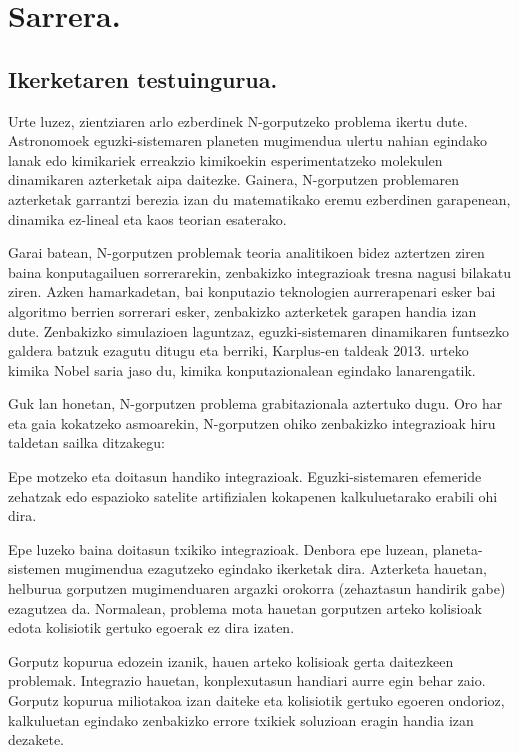 \chapter{Sarrera.}


\section{Ikerketaren testuingurua.}

Urte luzez, zientziaren arlo ezberdinek N-gorputzeko problema ikertu dute. Astronomoek eguzki-sistemaren planeten mugimendua ulertu nahian egindako lanak edo kimikariek erreakzio kimikoekin esperimentatzeko molekulen dinamikaren azterketak aipa daitezke. Gainera,  N-gorputzen problemaren azterketak garrantzi berezia izan du matematikako eremu ezberdinen garapenean,  dinamika ez-lineal eta kaos teorian esaterako. 

Garai batean, N-gorputzen problemak teoria analitikoen bidez aztertzen ziren baina konputagailuen sorrerarekin, zenbakizko integrazioak tresna nagusi bilakatu ziren. Azken hamarkadetan, bai konputazio teknologien aurrerapenari esker bai algoritmo berrien sorrerari esker, zenbakizko azterketek garapen handia izan dute. Zenbakizko simulazioen laguntzaz, eguzki-sistemaren dinamikaren funtsezko galdera batzuk ezagutu ditugu eta berriki, Karplus-en taldeak 2013. urteko kimika Nobel saria \cite{Karplus2014} jaso du, kimika konputazionalean egindako lanarengatik.       

Guk lan honetan, N-gorputzen problema grabitazionala aztertuko dugu. Oro har eta gaia kokatzeko asmoarekin, N-gorputzen ohiko zenbakizko  integrazioak hiru taldetan sailka ditzakegu:
\begin{enumerate}
{
\item Epe motzeko eta doitasun handiko integrazioak. 
 Eguzki-sistemaren efemeride zehatzak \cite{Folkner2014} edo espazioko satelite artifizialen kokapenen \cite{Beylkin2014} kalkuluetarako erabili ohi dira.
\item Epe luzeko baina doitasun txikiko integrazioak.
 Denbora epe luzean, planeta-sistemen mugimendua ezagutzeko egindako ikerketak dira. Azterketa hauetan, helburua gorputzen mugimenduaren argazki orokorra (zehaztasun handirik gabe) ezagutzea da. Normalean, problema mota hauetan gorputzen arteko kolisioak edota kolisiotik gertuko egoerak ez dira izaten.     
\item Gorputz kopurua edozein izanik, hauen arteko kolisioak gerta daitezkeen problemak.
 Integrazio hauetan, konplexutasun handiari aurre egin behar zaio. Gorputz kopurua miliotakoa \cite{Ishiyama2012} izan daiteke eta kolisiotik gertuko egoeren ondorioz, kalkuluetan egindako zenbakizko errore txikiek soluzioan eragin handia izan dezakete.    
}
\end{enumerate}

